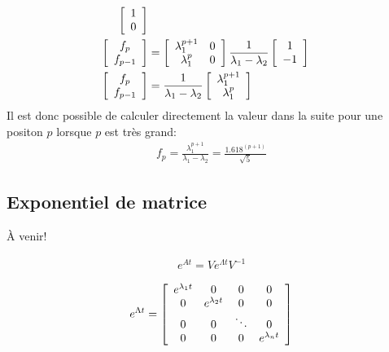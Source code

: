 \begin{example}
\begin{align}
\left[ \begin{array}{c}  
1 \\ 0
\end{array} \right]
\\
\left[ \begin{array}{c}  
f_p \\ f_{p-1}
\end{array} \right]
&= 
\left[ \begin{array}{c c}  
\lambda_1^{p+1} & 0 \\
\lambda_1^{p}  & 0\\
\end{array} \right]
\frac{1}{\lambda_1 - \lambda_2}
\left[ \begin{array}{c }  
1  \\
-1   \\
\end{array} \right] 
\\
\left[ \begin{array}{c}  
f_p \\ f_{p-1}
\end{array} \right]
&= 
\frac{1}{\lambda_1 - \lambda_2}
\left[ \begin{array}{c}  
\lambda_1^{p+1}\\
\lambda_1^{p} \\
\end{array} \right] 
\end{align}
Il est donc possible de calculer directement la valeur dans la suite pour une positon $p$ lorsque $p$ est très grand:
\begin{align}
f_p = \frac{\lambda_1^{p+1}}{\lambda_1 - \lambda_2} = \frac{1.618^{(p+1)}}{\sqrt{5}}
\end{align}
\end{example}

\subsection{Exponentiel de matrice}

À venir!


\begin{align}
e^{At} = V e^{\Lambda t} V^{-1}
\end{align}

\begin{align}
e^{\Lambda t} = 
\left[ \begin{array}{c c c c}  
e^{\lambda_1 t} &  0          & 0 & 0 \\
0         &  e^{\lambda_2 t}  & 0      & 0 \\
0         &  0          &\ddots  & 0 \\
0         &  0          & 0  & e^{\lambda_n t}
\end{array} \right]
\end{align}


